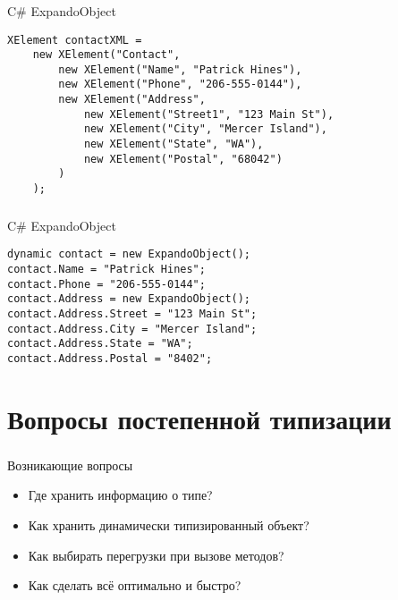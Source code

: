 \documentclass[t]{beamer}  %
\begin{document}
\begin{frame}[fragile]
	\frametitle{\insertsection} 
    \framesubtitle{\insertsubsection}
	\begin{block}{C\# ExpandoObject}
		\begin{verbatim}
XElement contactXML =
    new XElement("Contact",
        new XElement("Name", "Patrick Hines"),
        new XElement("Phone", "206-555-0144"),
        new XElement("Address",
            new XElement("Street1", "123 Main St"),
            new XElement("City", "Mercer Island"),
            new XElement("State", "WA"),
            new XElement("Postal", "68042")
        )
    );
		\end{verbatim}
	\end{block}
\end{frame}


\begin{frame}[fragile]
	\frametitle{\insertsection} 
    \framesubtitle{\insertsubsection}
	\begin{block}{C\# ExpandoObject}
		\begin{verbatim}
dynamic contact = new ExpandoObject();
contact.Name = "Patrick Hines";
contact.Phone = "206-555-0144";
contact.Address = new ExpandoObject();
contact.Address.Street = "123 Main St";
contact.Address.City = "Mercer Island";
contact.Address.State = "WA";
contact.Address.Postal = "8402";
		\end{verbatim}
	\end{block}
\end{frame}

\section{Вопросы постепенной типизации}
\begin{frame}
	\frametitle{\insertsection} 
    \begin{block}{Возникающие вопросы}
		\begin{itemize}
          \item Где хранить информацию о типе?
          \item Как хранить динамически типизированный объект?
          \item Как выбирать перегрузки при вызове методов?
          \item Как сделать всё оптимально и быстро?
		\end{itemize}
	\end{block}
\end{frame}
\end{document}
